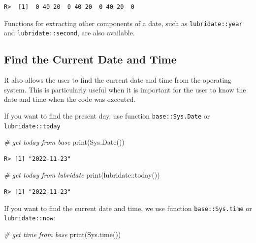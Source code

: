 \documentclass[
  12pt,
]{book}
\newenvironment{Shaded}{\begin{snugshade}}{\end{snugshade}}
\newcommand{\CommentTok}[1]{\textcolor[rgb]{0.37,0.37,0.37}{\textit{#1}}}
\newcommand{\FunctionTok}[1]{\textcolor[rgb]{0,0,0}{#1}}
\newcommand{\NormalTok}[1]{#1}
\newcommand{\SpecialCharTok}[1]{\textcolor[rgb]{0,0,0}{#1}}
\begin{document}
\begin{verbatim}
R>  [1]  0 40 20  0 40 20  0 40 20  0
\end{verbatim}

Functions for extracting other components of a date, such as \texttt{lubridate::year} and \texttt{lubridate::second}, are also available.

\hypertarget{find-the-current-date-and-time}{%
\subsection{Find the Current Date and Time}\label{find-the-current-date-and-time}}

R also allows the user to find the current date and time from the operating system. This is particularly useful when it is important for the user to know the date and time when the code was executed.

If you want to find the present day, use function \texttt{base::Sys.Date} or \texttt{lubridate::today}  

\begin{Shaded}
\begin{Highlighting}[]
\CommentTok{\# get today from base}
\FunctionTok{print}\NormalTok{(}\FunctionTok{Sys.Date}\NormalTok{())}
\end{Highlighting}
\end{Shaded}

\begin{verbatim}
R> [1] "2022-11-23"
\end{verbatim}

\begin{Shaded}
\begin{Highlighting}[]
\CommentTok{\# get today from lubridate}
\FunctionTok{print}\NormalTok{(lubridate}\SpecialCharTok{::}\FunctionTok{today}\NormalTok{())}
\end{Highlighting}
\end{Shaded}

\begin{verbatim}
R> [1] "2022-11-23"
\end{verbatim}

If you want to find the current date and time, we use function \texttt{base::Sys.time} or \texttt{lubridate::now}:  

\begin{Shaded}
\begin{Highlighting}[]
\CommentTok{\# get time from base}
\FunctionTok{print}\NormalTok{(}\FunctionTok{Sys.time}\NormalTok{())}
\end{Highlighting}
\end{Shaded}
\end{document}
